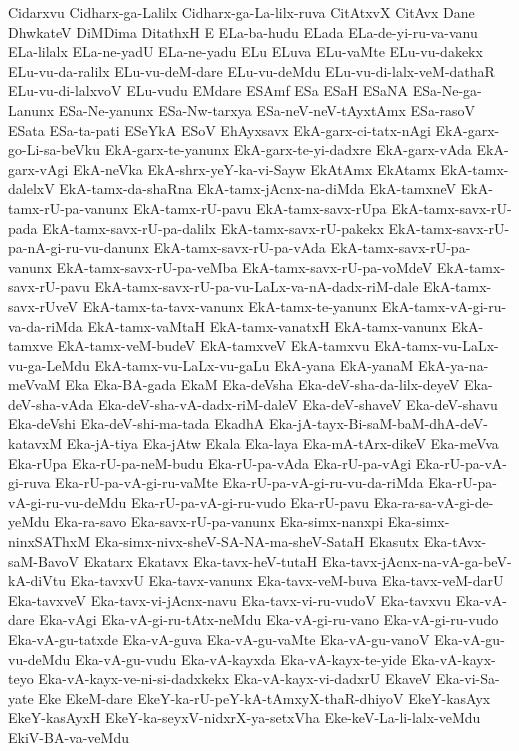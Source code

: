 {Cidarxvu
Cidharx-ga-Lalilx
Cidharx-ga-La-lilx-ruva
CitAtxvX
CitAvx
Dane
DhwkateV
DiMDima
DitathxH
E
ELa-ba-hudu
ELada
ELa-de-yi-ru-va-vanu
ELa-lilalx
ELa-ne-yadU
ELa-ne-yadu
ELu
ELuva
ELu-vaMte
ELu-vu-dakekx
ELu-vu-da-ralilx
ELu-vu-deM-dare
ELu-vu-deMdu
ELu-vu-di-lalx-veM-dathaR
ELu-vu-di-lalxvoV
ELu-vudu
EMdare
ESAmf
ESa
ESaH
ESaNA
ESa-Ne-ga-Lanunx
ESa-Ne-yanunx
ESa-Nw-tarxya
ESa-neV-neV-tAyxtAmx
ESa-rasoV
ESata
ESa-ta-pati
ESeYkA
ESoV
EhAyxsavx
EkA-garx-ci-tatx-nAgi
EkA-garx-go-Li-sa-beVku
EkA-garx-te-yanunx
EkA-garx-te-yi-dadxre
EkA-garx-vAda
EkA-garx-vAgi
EkA-neVka
EkA-shrx-yeY-ka-vi-Sayw
EkAtAmx
EkAtamx
EkA-tamx-dalelxV
EkA-tamx-da-shaRna
EkA-tamx-jAcnx-na-diMda
EkA-tamxneV
EkA-tamx-rU-pa-vanunx
EkA-tamx-rU-pavu
EkA-tamx-savx-rUpa
EkA-tamx-savx-rU-pada
EkA-tamx-savx-rU-pa-dalilx
EkA-tamx-savx-rU-pakekx
EkA-tamx-savx-rU-pa-nA-gi-ru-vu-danunx
EkA-tamx-savx-rU-pa-vAda
EkA-tamx-savx-rU-pa-vanunx
EkA-tamx-savx-rU-pa-veMba
EkA-tamx-savx-rU-pa-voMdeV
EkA-tamx-savx-rU-pavu
EkA-tamx-savx-rU-pa-vu-LaLx-va-nA-dadx-riM-dale
EkA-tamx-savx-rUveV
EkA-tamx-ta-tavx-vanunx
EkA-tamx-te-yanunx
EkA-tamx-vA-gi-ru-va-da-riMda
EkA-tamx-vaMtaH
EkA-tamx-vanatxH
EkA-tamx-vanunx
EkA-tamxve
EkA-tamx-veM-budeV
EkA-tamxveV
EkA-tamxvu
EkA-tamx-vu-LaLx-vu-ga-LeMdu
EkA-tamx-vu-LaLx-vu-gaLu
EkA-yana
EkA-yanaM
EkA-ya-na-meVvaM
Eka
Eka-BA-gada
EkaM
Eka-deVsha
Eka-deV-sha-da-lilx-deyeV
Eka-deV-sha-vAda
Eka-deV-sha-vA-dadx-riM-daleV
Eka-deV-shaveV
Eka-deV-shavu
Eka-deVshi
Eka-deV-shi-ma-tada
EkadhA
Eka-jA-tayx-Bi-saM-baM-dhA-deV-katavxM
Eka-jA-tiya
Eka-jAtw
Ekala
Eka-laya
Eka-mA-tArx-dikeV
Eka-meVva
Eka-rUpa
Eka-rU-pa-neM-budu
Eka-rU-pa-vAda
Eka-rU-pa-vAgi
Eka-rU-pa-vA-gi-ruva
Eka-rU-pa-vA-gi-ru-vaMte
Eka-rU-pa-vA-gi-ru-vu-da-riMda
Eka-rU-pa-vA-gi-ru-vu-deMdu
Eka-rU-pa-vA-gi-ru-vudo
Eka-rU-pavu
Eka-ra-sa-vA-gi-de-yeMdu
Eka-ra-savo
Eka-savx-rU-pa-vanunx
Eka-simx-nanxpi
Eka-simx-ninxSAThxM
Eka-simx-nivx-sheV-SA-NA-ma-sheV-SataH
Ekasutx
Eka-tAvx-saM-BavoV
Ekatarx
Ekatavx
Eka-tavx-heV-tutaH
Eka-tavx-jAcnx-na-vA-ga-beV-kA-diVtu
Eka-tavxvU
Eka-tavx-vanunx
Eka-tavx-veM-buva
Eka-tavx-veM-darU
Eka-tavxveV
Eka-tavx-vi-jAcnx-navu
Eka-tavx-vi-ru-vudoV
Eka-tavxvu
Eka-vA-dare
Eka-vAgi
Eka-vA-gi-ru-tAtx-neMdu
Eka-vA-gi-ru-vano
Eka-vA-gi-ru-vudo
Eka-vA-gu-tatxde
Eka-vA-guva
Eka-vA-gu-vaMte
Eka-vA-gu-vanoV
Eka-vA-gu-vu-deMdu
Eka-vA-gu-vudu
Eka-vA-kayxda
Eka-vA-kayx-te-yide
Eka-vA-kayx-teyo
Eka-vA-kayx-ve-ni-si-dadxkekx
Eka-vA-kayx-vi-dadxrU
EkaveV
Eka-vi-Sa-yate
Eke
EkeM-dare
EkeY-ka-rU-peY-kA-tAmxyX-thaR-dhiyoV
EkeY-kasAyx
EkeY-kasAyxH
EkeY-ka-seyxV-nidxrX-ya-setxVha
Eke-keV-La-li-lalx-veMdu
EkiV-BA-va-veMdu
}
